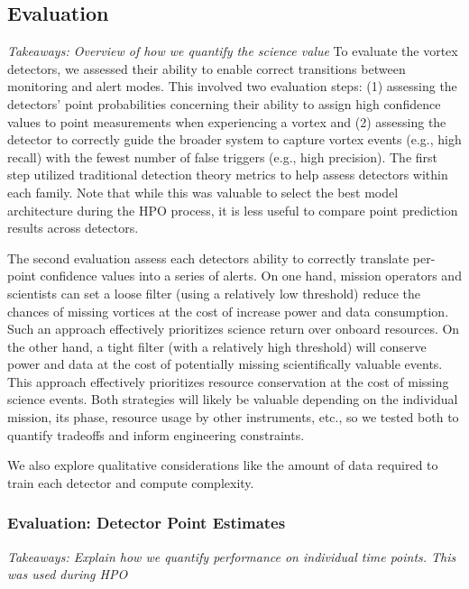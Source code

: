 \subsection{Evaluation}\label{subsec:evaluation}
\textit{Takeaways: Overview of how we quantify the science value }
To evaluate the vortex detectors, we assessed their ability to enable correct transitions between monitoring and alert modes. 
This involved two evaluation steps: (1) assessing the detectors' point probabilities concerning their ability to assign high confidence values to point measurements when experiencing a vortex and (2) assessing the detector to correctly guide the broader system to capture vortex events (e.g., high recall) with the fewest number of false triggers (e.g., high precision). The first step utilized traditional detection theory metrics to help assess detectors within each family. Note that while this was valuable to select the best model architecture during the \acrshort{HPO} process, it is less useful to compare point prediction results across detectors.

The second evaluation assess each detectors ability to correctly translate per-point confidence values into a series of alerts.
On one hand, mission operators and scientists can set a loose filter (using a relatively low threshold) reduce the chances of missing vortices at the cost of increase power and data consumption. 
Such an approach effectively prioritizes science return over onboard resources.
On the other hand, a tight filter (with a relatively high threshold) will conserve power and data at the cost of potentially missing scientifically valuable events. 
This approach effectively prioritizes resource conservation at the cost of missing science events.
Both strategies will likely be valuable depending on the individual mission, its phase, resource usage by other instruments, etc., so we tested both to quantify tradeoffs and inform engineering constraints.

We also explore qualitative considerations like the amount of data required to train each detector and compute complexity.

\subsubsection{Evaluation: Detector Point Estimates}\label{subsubsec:point_evaluation}
\textit{Takeaways: Explain how we quantify performance on individual time points. This was used during HPO}

